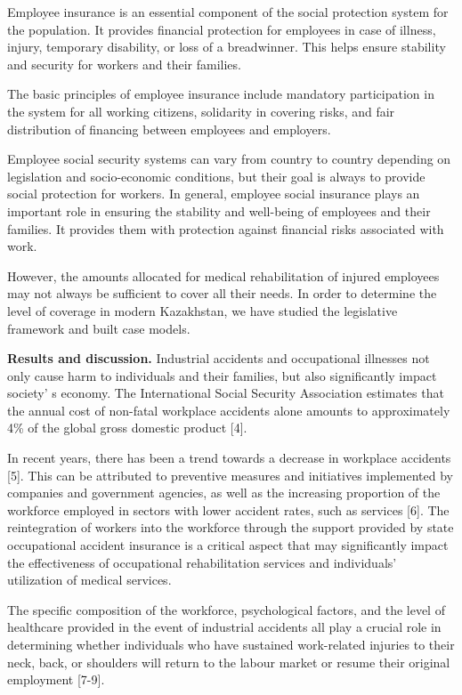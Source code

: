 \begin{multicols}{2}
Employee insurance is an essential component of the social protection
system for the population. It provides financial protection for
employees in case of illness, injury, temporary disability, or loss of a
breadwinner. This helps ensure stability and security for workers and
their families.

The basic principles of employee insurance include mandatory
participation in the system for all working citizens, solidarity in
covering risks, and fair distribution of financing between employees and
employers.

Employee social security systems can vary from country to country
depending on legislation and socio-economic conditions, but their goal
is always to provide social protection for workers. In general, employee
social insurance plays an important role in ensuring the stability and
well-being of employees and their families. It provides them with
protection against financial risks associated with work.

However, the amounts allocated for medical rehabilitation of injured
employees may not always be sufficient to cover all their needs. In
order to determine the level of coverage in modern Kazakhstan, we have
studied the legislative framework and built case models.

{\bfseries Results and discussion.} Industrial accidents and occupational
illnesses not only cause harm to individuals and their families, but
also significantly impact society' s economy. The
International Social Security Association estimates that the annual cost
of non-fatal workplace accidents alone amounts to approximately 4\% of
the global gross domestic product {[}4{]}.

In recent years, there has been a trend towards a decrease in workplace
accidents {[}5{]}. This can be attributed to preventive measures and
initiatives implemented by companies and government agencies, as well as
the increasing proportion of the workforce employed in sectors with
lower accident rates, such as services {[}6{]}. The reintegration of
workers into the workforce through the support provided by state
occupational accident insurance is a critical aspect that may
significantly impact the effectiveness of occupational rehabilitation
services and individuals'{} utilization of medical
services.

The specific composition of the workforce, psychological factors, and
the level of healthcare provided in the event of industrial accidents
all play a crucial role in determining whether individuals who have
sustained work-related injuries to their neck, back, or shoulders will
return to the labour market or resume their original employment
{[}7-9{]}.


\end{multicols}
